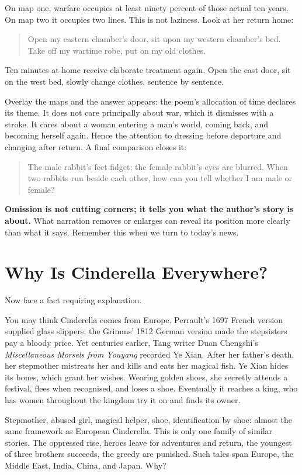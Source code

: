 On map one, warfare occupies at least ninety percent of those actual ten years. On map two it occupies two lines. This is not laziness. Look at her return home:

\begin{quote}
Open my eastern chamber's door, sit upon my western chamber's bed. Take off my wartime robe, put on my old clothes.
\end{quote}
Ten minutes at home receive elaborate treatment again. Open the east door, sit on the west bed, slowly change clothes, sentence by sentence.

Overlay the maps and the answer appears: the poem's allocation of time declares its theme. It does not care principally about war, which it dismisses with a stroke. It cares about a woman entering a man's world, coming back, and becoming herself again. Hence the attention to dressing before departure and changing after return. A final comparison closes it:

\begin{quote}
The male rabbit's feet fidget; the female rabbit's eyes are blurred. When two rabbits run beside each other, how can you tell whether I am male or female?
\end{quote}
\textbf{Omission is not cutting corners; it tells you what the author's story is about.} What narration removes or enlarges can reveal its position more clearly than what it says. Remember this when we turn to today's news.

\section{Why Is Cinderella Everywhere?}
Now face a fact requiring explanation.

You may think Cinderella comes from Europe. Perrault's 1697 French version supplied glass slippers; the Grimms' 1812 German version made the stepsisters pay a bloody price. Yet centuries earlier, Tang writer Duan Chengshi's \emph{Miscellaneous Morsels from Youyang} recorded Ye Xian. After her father's death, her stepmother mistreats her and kills and eats her magical fish. Ye Xian hides its bones, which grant her wishes. Wearing golden shoes, she secretly attends a festival, flees when recognised, and loses a shoe. Eventually it reaches a king, who has women throughout the kingdom try it on and finds its owner.

Stepmother, abused girl, magical helper, shoe, identification by shoe: almost the same framework as European Cinderella. This is only one family of similar stories. The oppressed rise, heroes leave for adventures and return, the youngest of three brothers succeeds, the greedy are punished. Such tales span Europe, the Middle East, India, China, and Japan. Why?

